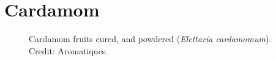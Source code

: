 


\section{Cardamom}
\label{sec:cardamom}\label{sec:black_cardamom}



\begin{figure}[!ht]
	\vspace{-2ex}
	\centering
	\hfill
	\hfill
	\caption[True cardamoms]{Cardamom fruits cured, and powdered (\textit{Elettaria cardamomum}). Credit: Aromatiques.}
	\label{fig:cardamom_imgs}
\end{figure}

